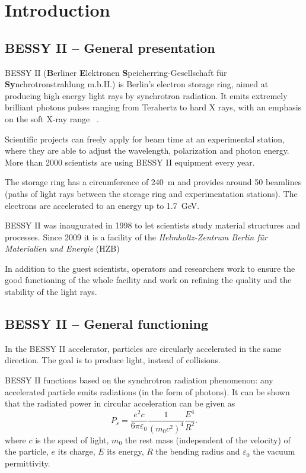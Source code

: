 
\chapter{Introduction}
\label{sec:background}

\section{BESSY II -- General presentation}
BESSY II (\textbf{B}erliner \textbf{E}lektronen \textbf{S}peicherring-Gesellschaft für \textbf{Sy}n\-chro\-tron\-strahlung m.b.H.) is Berlin's electron storage ring, aimed at producing high energy light rays by synchrotron radiation. It emits extremely brilliant photons pulses ranging from Terahertz to hard X rays, with an emphasis on the soft X-ray range ~\cite{web:bessy_homepage}.

Scientific projects can freely apply for beam time at an experimental station, where they are able to adjust the wavelength, polarization and photon energy. More than 2000 scientists are using BESSY II equipment every year.

The storage ring has a circumference of \SI{240}{\meter} and provides around 50 beamlines (paths of light rays between the storage ring and experimentation stations). The electrons are accelerated to an energy up to \SI{1.7}{\giga\electronvolt}.

BESSY II was inaugurated in 1998 to let scientists study material structures and processes. Since 2009 it is a facility of the \textit{Helmholtz-Zentrum Berlin für Materialien und Energie} (HZB)

In addition to the guest scientists, operators and researchers work to ensure the good functioning of the whole facility and work on refining the quality and the stability of the light rays.

\section{BESSY II -- General functioning}
In the BESSY II  accelerator, particles are circularly accelerated in the same direction. The goal is to produce light, instead of collisions.

BESSY II functions based on the synchrotron radiation phenomenon: any accelerated particle emits radiations (in the form of photons). It can be shown~\cite{book:wille} that the radiated power in circular acceleration can be given as
\begin{equation}
P_s = \frac{e^2 c}{6 \pi \varepsilon_0}\frac{1}{(m_0 c^2)^4}\frac{E^4}{R^2}.
\end{equation}
where $c$ is the speed of light, $m_0$ the rest mass (independent of the velocity) of the particle, $e$ its charge, $E$ its energy, $R$ the bending radius and $\varepsilon_0$ the  vacuum permittivity.

